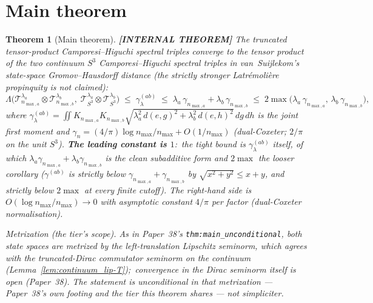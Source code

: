 \documentclass[11pt,a4paper]{article}
\theoremstyle{plain}
\newtheorem{theorem}{Theorem}[section]
\theoremstyle{definition}
\newcommand{\nmax}{n_{\max}}
\newcommand{\nmaxa}{n_{\max,a}}
\newcommand{\nmaxb}{n_{\max,b}}
\newcommand{\sthree}{S^{3}}
\newcommand{\Tcal}{\mathcal{T}}
\newcommand{\KS}{K}
\begin{document}
\section{Main theorem}\label{sec:main_theorem}

\begin{theorem}[Main theorem]\label{thm:main}
\textbf{[INTERNAL THEOREM]} The truncated tensor-product
Camporesi--Higuchi spectral triples converge to the tensor product of
the two continuum $\sthree$ Camporesi--Higuchi spectral triples in
van~Suijlekom's state-space Gromov--Hausdorff distance (the strictly
stronger Latr\'emoli\`ere propinquity is not claimed):
\begin{equation}\label{eq:main_thm}
   \Lambda\bigl(\Tcal_{\nmaxa}^{\lambda_a} \otimes
                \Tcal_{\nmaxb}^{\lambda_b},\;
                \Tcal_{\sthree}^{\lambda_a} \otimes
                \Tcal_{\sthree}^{\lambda_b}\bigr)
   \;\le\; \gamma^{(ab)}_\lambda
   \;\le\; \lambda_a\,\gamma_{\nmaxa} + \lambda_b\,\gamma_{\nmaxb}
   \;\le\; 2\max\!\bigl(\lambda_a\,\gamma_{\nmaxa},\,
                        \lambda_b\,\gamma_{\nmaxb}\bigr),
\end{equation}
where $\gamma^{(ab)}_\lambda = \iint \KS_{\nmaxa}\KS_{\nmaxb}
\sqrt{\lambda_a^2\,d(e,g)^2 + \lambda_b^2\,d(e,h)^2}\,dg\,dh$ is the joint
first moment and $\gamma_n = (4/\pi)\log\nmax/\nmax + O(1/\nmax)$
(dual-Coxeter; $2/\pi$ on the unit $\sthree$). \textbf{The leading
constant is $1$}:\ the tight bound is $\gamma^{(ab)}_\lambda$ itself, of
which $\lambda_a\gamma_{\nmaxa} + \lambda_b\gamma_{\nmaxb}$ is the clean
subadditive form and $2\max$ the looser corollary ($\gamma^{(ab)}$ is
strictly below $\gamma_{\nmaxa}+\gamma_{\nmaxb}$ by
$\sqrt{x^2+y^2} \le x+y$, and strictly below $2\max$ at every finite
cutoff). The right-hand
side is $O(\log\nmax/\nmax) \to 0$ with asymptotic constant
$4/\pi$ per factor (dual-Coxeter normalisation).

\emph{Metrization (the tier's scope).} As in Paper~38's
\texttt{thm:main\_unconditional}, both state spaces are metrized by the
left-\emph{translation} Lipschitz seminorm, which agrees with the
truncated-Dirac commutator seminorm on the continuum
(Lemma~\ref{lem:continuum_lip-T});\ convergence in the Dirac seminorm
itself is open (Paper~38). The statement is unconditional \emph{in that metrization}
--- Paper~38's own footing and the tier this theorem shares --- not
simpliciter.


\end{theorem}
\end{document}
